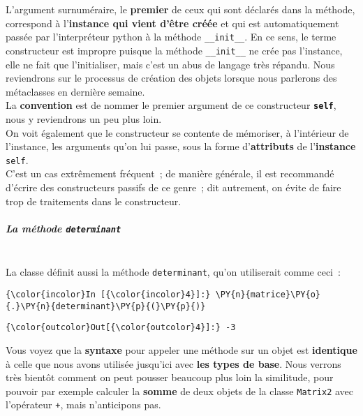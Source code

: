 L'argument surnuméraire, le \textbf{premier} de ceux qui sont déclarés
dans la méthode, correspond à l'\textbf{instance qui vient d'être créée}
et qui est automatiquement passée par l'interpréteur python à la méthode
\texttt{\_\_init\_\_}. En ce sens, le terme constructeur est impropre
puisque la méthode \texttt{\_\_init\_\_} ne crée pas l'instance, elle ne
fait que l'initialiser, mais c'est un abus de langage très répandu. Nous
reviendrons sur le processus de création des objets lorsque nous
parlerons des métaclasses en dernière semaine.\\

La \textbf{convention} est de nommer le premier argument de ce
constructeur \textbf{\texttt{self}}, nous y reviendrons un peu plus
loin.\\

    On voit également que le constructeur se contente de mémoriser, à
l'intérieur de l'instance, les arguments qu'on lui passe, sous la forme
d'\textbf{attributs} de l'\textbf{instance} \texttt{self}.\\

C'est un cas extrêmement fréquent~; de manière générale, il est
recommandé d'écrire des constructeurs passifs de ce genre~; dit
autrement, on évite de faire trop de traitements dans le constructeur.

    \hypertarget{la-muxe9thode-determinant}{%
\subparagraph{\texorpdfstring{La méthode
\texttt{determinant}\\\\}{La méthode determinant}}\label{la-muxe9thode-determinant}}

    La classe définit aussi la méthode \texttt{determinant}, qu'on
utiliserait comme ceci~:

    \begin{Verbatim}[commandchars=\\\{\}]
{\color{incolor}In [{\color{incolor}4}]:} \PY{n}{matrice}\PY{o}{.}\PY{n}{determinant}\PY{p}{(}\PY{p}{)}
\end{Verbatim}


\begin{Verbatim}[commandchars=\\\{\}]
{\color{outcolor}Out[{\color{outcolor}4}]:} -3
\end{Verbatim}
            
    Vous voyez que la \textbf{syntaxe} pour appeler une méthode sur un objet
est \textbf{identique} à celle que nous avons utilisée jusqu'ici avec
\textbf{les types de base}. Nous verrons très bientôt comment on peut
pousser beaucoup plus loin la similitude, pour pouvoir par exemple
calculer la \textbf{somme} de deux objets de la classe \texttt{Matrix2}
avec l'opérateur \texttt{+}, mais n'anticipons pas.\\


